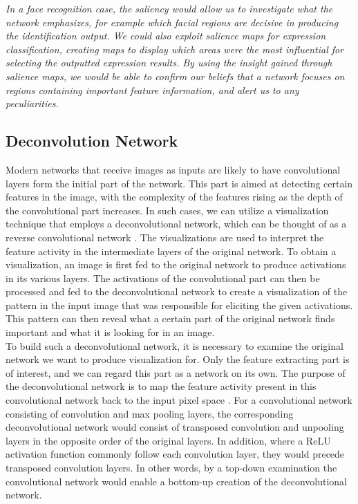 \noindent \textit{In a face recognition case, the saliency would allow us to investigate what the network emphasizes, for example which facial regions are decisive in producing the identification output. We could also exploit salience maps for expression classification, creating maps to display which areas were the most influential for selecting the outputted expression results. By using the insight gained through salience maps, we would be able to confirm our beliefs that a network focuses on regions containing important feature information, and alert us to any peculiarities.}

\subsection{Deconvolution Network}

Modern networks that receive images as inputs are likely to have convolutional layers form the initial part of the network. This part is aimed at detecting certain features in the image, with the complexity of the features rising as the depth of the convolutional part increases. In such cases, we can utilize a visualization technique that employs a deconvolutional network, which can be thought of as a reverse convolutional network \cite{deconv_net}. The visualizations are used to interpret the feature activity in the intermediate layers of the original network. To obtain a visualization, an image is first fed to the original network to produce activations in its various layers. The activations of the convolutional part can then be processed and fed to the deconvolutional network to create a visualization of the pattern in the input image that was responsible for eliciting the given activations. This pattern can then reveal what a certain part of the original network finds important and what it is looking for in an image. \\

\noindent To build such a deconvolutional network, it is necessary to examine the original network we want to produce visualization for. Only the feature extracting part is of interest, and we can regard this part as a network on its own. The purpose of the deconvolutional network is to map the feature activity present in this convolutional network back to the input pixel space \cite{deconv_vis}. For a convolutional network consisting of convolution and max pooling layers, the corresponding deconvolutional network would consist of transposed convolution and unpooling layers in the opposite order of the original layers. In addition, where a ReLU activation function commonly follow each convolution layer, they would precede transposed convolution layers. In other words, by a top-down examination the convolutional network would enable a bottom-up creation of the deconvolutional network. \\

